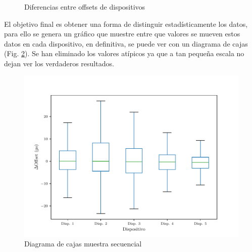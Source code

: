 \begin{figure}[htpb!]
    \centering
    \quad
    \caption{Diferencias entre offsets de dispositivos}
    \label{fig:off_acu_secuencial_diffs}
\end{figure}

El objetivo final es obtener una forma de distinguir estadísticamente los datos, para ello se genera un gráfico que muestre entre que valores se mueven estos datos en cada dispositivo, en definitiva, se puede ver con un diagrama de cajas (Fig. \ref{fig:box_secuencial}). Se han eliminado los valores atípicos ya que a tan pequeña escala no dejan ver los verdaderos resultados.

\begin{figure}[htpb!]
    \centering
    \includegraphics[scale=0.65]{../Python/plots/individual/boxplot_no_out}
    \caption{Diagrama de cajas muestra secuencial}
    \label{fig:box_secuencial}
\end{figure}

